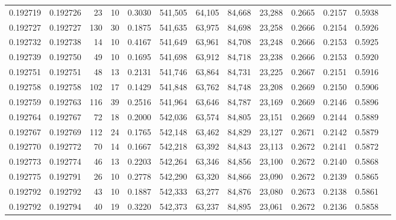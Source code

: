 \begin{tabular}{rrrrrrrrrrrrr}
0.192719 & 0.192726 &    23 &  10 &                                     0.3030 & 541,505 &  64,105 &  84,668 &  23,288 & 0.2665 & 0.2157 & 0.5938 \\
0.192727 & 0.192727 &   130 &  30 &                                     0.1875 & 541,635 &  63,975 &  84,698 &  23,258 & 0.2666 & 0.2154 & 0.5926 \\
0.192732 & 0.192738 &    14 &  10 &                                     0.4167 & 541,649 &  63,961 &  84,708 &  23,248 & 0.2666 & 0.2153 & 0.5925 \\
0.192739 & 0.192750 &    49 &  10 &                                     0.1695 & 541,698 &  63,912 &  84,718 &  23,238 & 0.2666 & 0.2153 & 0.5920 \\
0.192751 & 0.192751 &    48 &  13 &                                     0.2131 & 541,746 &  63,864 &  84,731 &  23,225 & 0.2667 & 0.2151 & 0.5916 \\
0.192758 & 0.192758 &   102 &  17 &                                     0.1429 & 541,848 &  63,762 &  84,748 &  23,208 & 0.2669 & 0.2150 & 0.5906 \\
0.192759 & 0.192763 &   116 &  39 &                                     0.2516 & 541,964 &  63,646 &  84,787 &  23,169 & 0.2669 & 0.2146 & 0.5896 \\
0.192764 & 0.192767 &    72 &  18 &                                     0.2000 & 542,036 &  63,574 &  84,805 &  23,151 & 0.2669 & 0.2144 & 0.5889 \\
0.192767 & 0.192769 &   112 &  24 &                                     0.1765 & 542,148 &  63,462 &  84,829 &  23,127 & 0.2671 & 0.2142 & 0.5879 \\
0.192770 & 0.192772 &    70 &  14 &                                     0.1667 & 542,218 &  63,392 &  84,843 &  23,113 & 0.2672 & 0.2141 & 0.5872 \\
0.192773 & 0.192774 &    46 &  13 &                                     0.2203 & 542,264 &  63,346 &  84,856 &  23,100 & 0.2672 & 0.2140 & 0.5868 \\
0.192775 & 0.192791 &    26 &  10 &                                     0.2778 & 542,290 &  63,320 &  84,866 &  23,090 & 0.2672 & 0.2139 & 0.5865 \\
0.192792 & 0.192792 &    43 &  10 &                                     0.1887 & 542,333 &  63,277 &  84,876 &  23,080 & 0.2673 & 0.2138 & 0.5861 \\
0.192792 & 0.192794 &    40 &  19 &                                     0.3220 & 542,373 &  63,237 &  84,895 &  23,061 & 0.2672 & 0.2136 & 0.5858 \\

\end{tabular}
